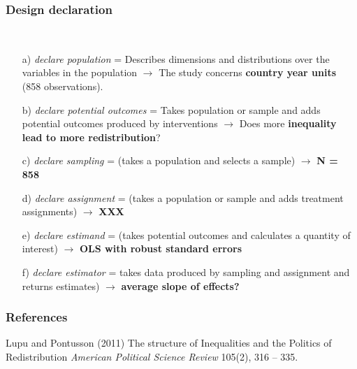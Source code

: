 \documentclass{beamer}
\begin{document}
\begin{frame}
\end{frame}


\begin{frame}
\frametitle{Design declaration}\
\begin{itemize}
\item[a)] \textit{declare population} = Describes dimensions and distributions over the variables in the population  $\longrightarrow$ The study concerns\textbf{ country year units} (858 observations).
\item[b)] \textit{declare potential outcomes} = Takes population or sample and adds potential outcomes produced by interventions $\longrightarrow$ Does more \textbf{inequality lead to more redistribution}?  
\item[c)] \textit{declare sampling} = (takes a population and selects a sample)  $\longrightarrow$ \textbf{N = 858}
\item[d)] \textit{declare assignment} = (takes a population or sample and adds treatment assignments)  $\longrightarrow$ \textbf{XXX}
\item[e)]\textit{declare estimand} = (takes potential outcomes and calculates a quantity of interest) $\longrightarrow$ \textbf{OLS with robust standard errors}
\item[f)]\textit{declare estimator} = takes data produced by sampling and assignment and returns estimates) $\longrightarrow$ \textbf{average slope of effects?}
\end{itemize}
\end{frame}
\begin{frame}
\frametitle{References}
\footnotesize{
\begin{thebibliography}{99}
 Lupu and Pontusson (2011)
\newblock The structure of Inequalities and the Politics of Redistribution
\newblock \emph{American Political Science Review} 105(2), 316 -- 335.

\end{thebibliography}
}
\end{frame}
\end{document}
